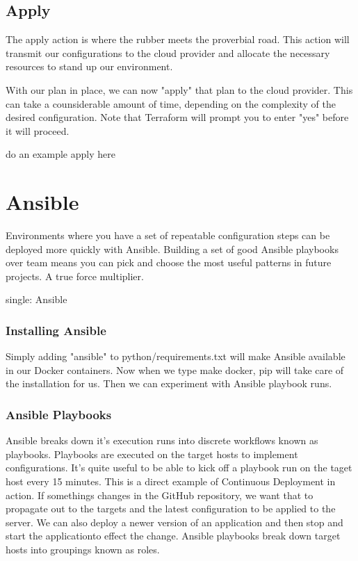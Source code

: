 \subsection{Apply}

The apply action is where the rubber meets the proverbial road. This
action will transmit our configurations to the cloud provider and
allocate the necessary resources to stand up our environment.

With our plan in place, we can now "apply" that plan to the cloud
provider. This can take a counsiderable amount of time, depending on the
complexity of the desired configuration. Note that Terraform will prompt
you to enter "yes" before it will proceed.

do an example apply here

\section{Ansible}

\justify
Environments where you have a set of repeatable configuration steps can
be deployed more quickly with Ansible. Building a set of good Ansible
playbooks over team means you can pick and choose the most useful
patterns in future projects. A true force multiplier.

single: Ansible

\subsubsection{Installing Ansible}
\justify
Simply adding "ansible" to python/requirements.txt will make Ansible
available in our Docker containers. Now when we type make docker, pip
will take care of the installation for us. Then we can experiment with
Ansible playbook runs.

\subsubsection{Ansible Playbooks}
\justify
Ansible breaks down it's execution runs into discrete workflows known as
playbooks. Playbooks are executed on the target hosts to implement
configurations. It's quite useful to be able to kick off a playbook run
on the taget host every 15 minutes. This is a direct example of
Continuous Deployment in action. If somethings changes in the GitHub
repository, we want that to propagate out to the targets and the latest
configuration to be applied to the server. We can also deploy a newer
version of an application and then stop and start the applicationto
effect the change.
\justify
Ansible playbooks break down target hosts into groupings known as roles.

